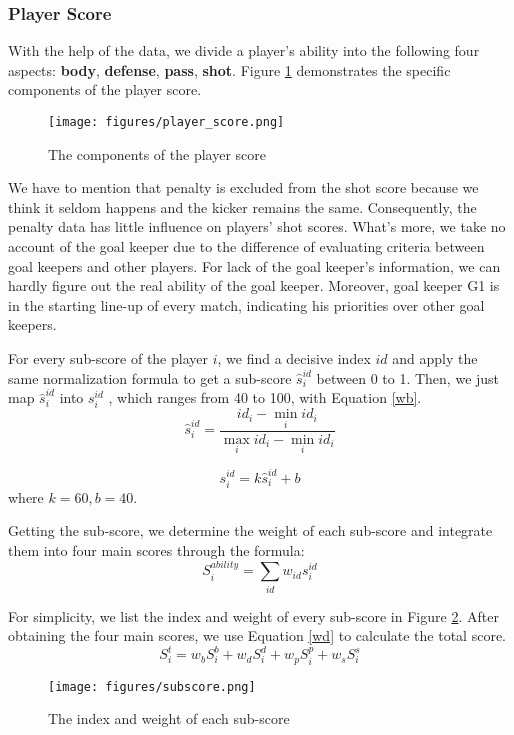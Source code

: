 \documentclass{mcmthesis}
\begin{document}
\subsubsection{Player Score}
With the help of the data, we divide a player's ability into the following four aspects: \textbf{body}, \textbf{defense}, \textbf{pass}, \textbf{shot}. Figure \ref{player_score} demonstrates the specific components of the player score.
\begin{figure}[htbp]
  \centering
  \texttt{[image: figures/player\_score.png]}
  \caption{The components of the player score}\label{player_score}
\end{figure}
We have to mention that penalty is excluded from the shot score because we think it seldom happens and the kicker remains the same. Consequently, the penalty data has little influence on players' shot scores. What's more, we take no account of the goal keeper due to the difference of evaluating criteria between goal keepers and other players. For lack of the goal keeper's information, we can hardly figure out the real ability of the goal keeper. Moreover, goal keeper G1 is in the starting line-up of every match, indicating his priorities over other goal keepers.

For every sub-score of the player $i$, we find a decisive index $id$ and apply the same normalization formula to get a sub-score $\hat{s}^{id}_{i}$ between 0 to 1. Then, we just map $\hat{s}^{id}_{i}$ into $s^{id}_{i}$ , which ranges from 40 to 100, with Equation \eqref{wb}.
$$
    \hat{s}^{id}_{i}=\frac{id_{i}-\min \limits_{i}id_{i}}{\max \limits_{i}id_{i}-\min \limits_{i}id_{i}}
$$

\begin{equation}\label{wb}
    s^{id}_{i}=k\hat{s}^{id}_{i}+b
\end{equation}
where $k = 60, b = 40$.

Getting the sub-score, we determine the weight of each sub-score and integrate them into four main scores through the formula:
$$
    S^{ability}_{i} = \sum_{id}w_{id}s^{id}_{i}
$$

For simplicity, we list the index and weight of every sub-score in Figure \ref{sub-score}. After obtaining the four main scores, we use Equation \eqref{wd} to calculate the total score.
$$
    S^{t}_{i} = w_{b}S^{b}_{i}+w_{d}S^{d}_{i}+w_{p}S^{p}_{i}+w_{s}S^{s}_{i}
$$

\begin{figure}[htbp]
  \centering
  \texttt{[image: figures/subscore.png]}
  \caption{The index and weight of each sub-score}\label{sub-score}
\end{figure}
\end{document}
